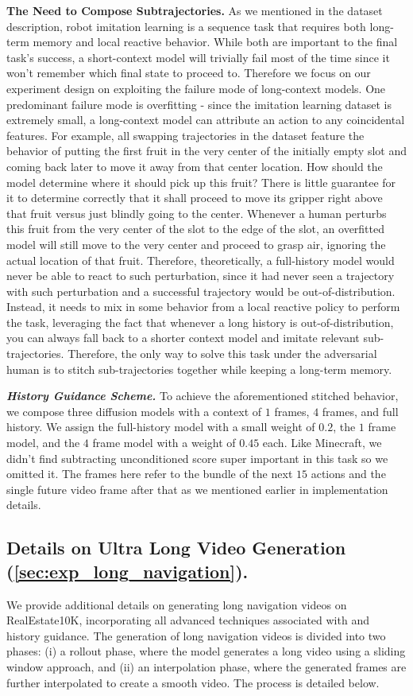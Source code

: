 \textbf{The Need to Compose Subtrajectories.}
As we mentioned in the dataset description, robot imitation learning is a sequence task that requires both long-term memory and local reactive behavior. While both are important to the final task's success, a short-context model will trivially fail most of the time since it won't remember which final state to proceed to. Therefore we focus on our experiment design on exploiting the failure mode of long-context models. One predominant failure mode is overfitting - since the imitation learning dataset is extremely small, a long-context model can attribute an action to any coincidental features. For example, all swapping trajectories in the dataset feature the behavior of putting the first fruit in the very center of the initially empty slot and coming back later to move it away from that center location. How should the model determine where it should pick up this fruit? There is little guarantee for it to determine correctly that it shall proceed to move its gripper right above that fruit versus just blindly going to the center. Whenever a human perturbs this fruit from the very center of the slot to the edge of the slot, an overfitted model will still move to the very center and proceed to grasp air, ignoring the actual location of that fruit. Therefore, theoretically, a full-history model would never be able to react to such perturbation, since it had never seen a trajectory with such perturbation and a successful trajectory would be out-of-distribution. Instead, it needs to mix in some behavior from a local reactive policy to perform the task, leveraging the fact that whenever a long history is out-of-distribution, you can always fall back to a shorter context model and imitate relevant sub-trajectories. Therefore, the only way to solve this task under the adversarial human is to stitch sub-trajectories together while keeping a long-term memory. 

\textbf{\emph{History Guidance Scheme.}}
To achieve the aforementioned stitched behavior, we compose three diffusion models with a context of $1$ frames, $4$ frames, and full history. We assign the full-history model with a small weight of $0.2$, the $1$ frame model, and the $4$ frame model with a weight of $0.45$ each. Like Minecraft, we didn't find subtracting unconditioned score super important in this task so we omitted it. The frames here refer to the bundle of the next $15$ actions and the single future video frame after that as we mentioned earlier in implementation details. 

\subsection{Details on Ultra Long Video Generation (\cref{sec:exp_long_navigation}).}
\label{appendix:long_rollout_details}
We provide additional details on generating long navigation videos on RealEstate10K, incorporating all advanced techniques associated with \mtd and history guidance. The generation of long navigation videos is divided into two phases: (i) a rollout phase, where the model generates a long video using a sliding window approach, and (ii) an interpolation phase, where the generated frames are further interpolated to create a smooth video. The process is detailed below.

